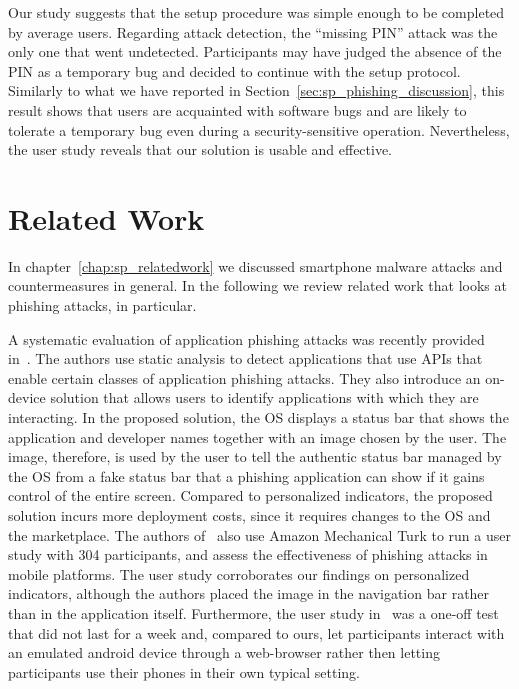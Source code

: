 Our study suggests that the setup procedure was simple enough to be completed by average users.
Regarding attack detection, the ``missing PIN'' attack was the only one that went undetected.
Participants may have judged the absence of the PIN as a temporary bug and decided to continue with the setup protocol.
Similarly to what we have reported in Section~\ref{sec:sp_phishing_discussion}, this result shows that users are acquainted with software bugs and
are likely to tolerate a temporary bug even during a security-sensitive operation.
Nevertheless, the user study reveals that our solution is usable and effective.

\section{Related Work}

In chapter~\ref{chap:sp_relatedwork} we discussed smartphone malware attacks and countermeasures in general. In the following we review related work that looks at phishing attacks, in particular.

A systematic evaluation of application phishing attacks was recently provided in~\cite{bianchi15sp}. The authors use static analysis to detect applications
that use APIs that enable certain classes of application phishing attacks.
They also introduce an on-device solution that allows users to identify applications with which they are interacting.
In the proposed solution, the OS displays a status bar that shows the application and developer names together with an image chosen by the user.
The image, therefore, is used by the user to tell the authentic status bar managed by the OS from a fake status bar that a phishing application can show if it gains control of the entire screen.
Compared to personalized indicators, the proposed solution incurs more deployment costs, since it requires changes to the OS and the marketplace.
The authors of~\cite{bianchi15sp} also use Amazon Mechanical Turk to run a user study with 304 participants, and assess the effectiveness of phishing attacks in mobile platforms. 
The user study corroborates our findings on personalized indicators, although the authors placed the image in the navigation bar rather than in the application itself. 
Furthermore, the user study in~\cite{bianchi15sp} was a one-off test that did not last for a week and, compared to ours, let participants interact with an emulated android device through a web-browser rather then letting participants use their phones in their own typical setting.

